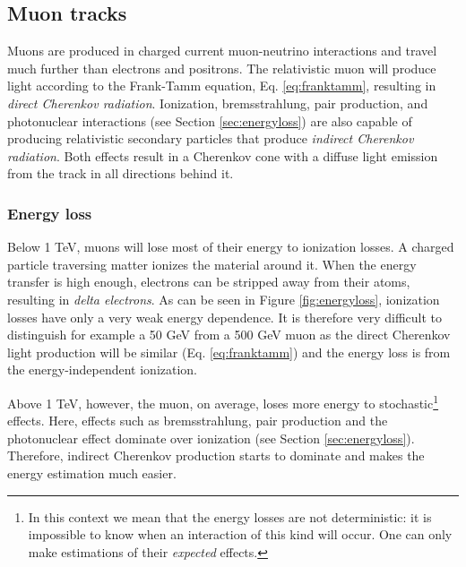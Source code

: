 \subsection{Muon tracks}
Muons are produced in charged current muon-neutrino interactions and travel much further than electrons and positrons. The relativistic muon will produce light according to the Frank-Tamm equation, Eq. \ref{eq:franktamm}, resulting in \textit{direct Cherenkov radiation}. Ionization, bremsstrahlung, pair production, and photonuclear interactions (see Section \ref{sec:energyloss}) are also capable of producing relativistic secondary particles that produce \textit{indirect Cherenkov radiation}. Both effects result in a Cherenkov cone with a diffuse light emission from the track in all directions behind it. 

\subsubsection{Energy loss}
\label{subsub:energyloss}
Below 1 TeV, muons will lose most of their energy to ionization losses. A charged particle traversing matter ionizes the material around it. When the energy transfer is high enough, electrons can be stripped away from their atoms, resulting in \textit{delta electrons}. As can be seen in Figure \ref{fig:energyloss}, ionization losses have only a very weak energy dependence. It is therefore very difficult to distinguish for example a 50 GeV from a 500 GeV muon as the direct Cherenkov light production will be similar (Eq. \ref{eq:franktamm}) and the energy loss is from the energy-independent ionization.

Above 1 TeV, however, the muon, on average, loses more energy to stochastic\footnote{In this context we mean that the energy losses are not deterministic: it is impossible to know when an interaction of this kind will occur. One can only make estimations of their \textit{expected} effects.} effects. Here, effects such as bremsstrahlung, pair production and the photonuclear effect dominate over ionization (see Section \ref{sec:energyloss}). Therefore, indirect Cherenkov production starts to dominate and makes the energy estimation much easier.\\

